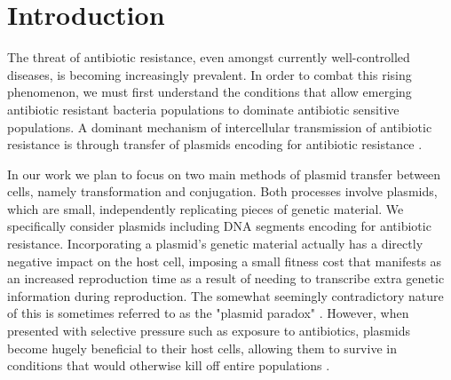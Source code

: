 \documentclass[numbib]{buthesis_p}  %
\begin{document}
\author{J. Russo}
\maketitle

\setlength{\columnseprule}{1pt}

\newcommand\blfootnote[1]{%
  \begingroup
  \renewcommand\thefootnote{}\footnote{#1}%
  \addtocounter{footnote}{-1}%
  \endgroup
}


\section{Introduction}
The threat of antibiotic resistance, even amongst currently well-controlled diseases,
is becoming increasingly prevalent. In order to combat this rising phenomenon, %
we must first understand the conditions that allow emerging antibiotic resistant
bacteria populations to dominate antibiotic sensitive populations. A dominant
mechanism of intercellular transmission of antibiotic resistance is through
transfer of plasmids encoding for antibiotic resistance \cite{transfer}.

In our work we plan to focus on two main methods of plasmid transfer
 between cells, namely transformation and conjugation. Both
processes involve plasmids, which are small, independently replicating pieces %
of genetic material. We specifically consider plasmids including DNA segments
encoding for antibiotic resistance. %
Incorporating a plasmid's genetic material actually has a directly negative impact on
the host cell, imposing a small fitness cost\cite{fitnesscost} that manifests as an increased
reproduction time as a result of needing to transcribe %
extra genetic information during reproduction. The somewhat seemingly contradictory nature
of this is sometimes referred to as the "plasmid paradox" \cite{plasmidparadox}.
However, when presented with selective pressure such as exposure to antibiotics,
plasmids become hugely beneficial to their host cells, allowing them to survive
in conditions that would otherwise kill off entire populations \cite{plasmidparadox}\cite{fitnesscost}. %
\end{document}
